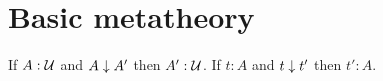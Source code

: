 \documentclass[hott-all.tex]{subfiles}
\begin{document}
\section{Basic metatheory}
%
%
%
%
%
%
\begin{thm}\label{thm:conversion-preserves-typing}
If $A : \mathcal{U}$ and $A \downarrow A'$ then $A' : \mathcal{U}$.
If $t:A$ and $t \downarrow t'$ then $t':A$.
\end{thm}
%
\end{document}
